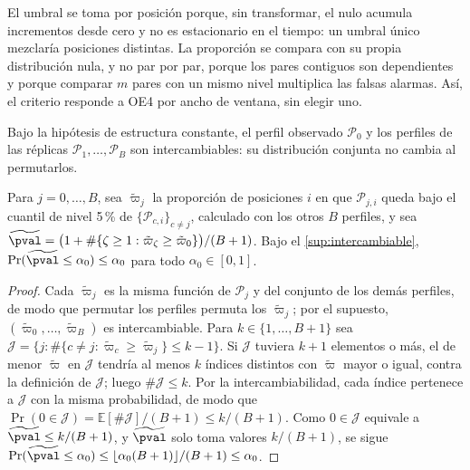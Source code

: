 El umbral se toma por posición porque, sin transformar, el nulo acumula incrementos desde cero y
no es estacionario en el tiempo: un umbral único mezclaría posiciones distintas. La proporción se
compara con su propia distribución nula, y no par por par, porque los pares contiguos son
dependientes y porque comparar $m$ pares con un mismo nivel multiplica las falsas alarmas. Así, el
criterio responde a OE4 por ancho de ventana, sin elegir uno.

\begin{supuesto}\label{sup:intercambiable}
Bajo la hipótesis de estructura constante, el perfil observado $\mathcal{P}_0$ y los perfiles de las réplicas
$\mathcal{P}_1,\dots,\mathcal{P}_B$ son intercambiables: su distribución conjunta no cambia al permutarlos.
\end{supuesto}

\begin{proposicion}\label{prop:oe4}
Para $j=0,\dots,B$, sea $\tilde\varpi_j$ la proporción de posiciones $i$ en que $\mathcal{P}_{j,i}$ queda bajo el
cuantil de nivel 5\,\% de $\{\mathcal{P}_{c,i}\}_{c\ne j}$, calculado con los otros $B$ perfiles, y sea
$\widetilde{\pval}=\bigl(1+\#\{\zeta\ge1:\tilde\varpi_\zeta\ge\tilde\varpi_0\}\bigr)/(B+1)$. Bajo el \cref{sup:intercambiable},
$\Pr(\widetilde{\pval}\le\alpha_0)\le\alpha_0$ para todo $\alpha_0\in[0,1]$.
\end{proposicion}

\begin{proof}
Cada $\tilde\varpi_j$ es la misma función de $\mathcal{P}_j$ y del conjunto de los demás perfiles, de modo que permutar
los perfiles permuta los $\tilde\varpi_j$; por el supuesto, $(\tilde\varpi_0,\dots,\tilde\varpi_B)$ es intercambiable. Para
$k\in\{1,\dots,B+1\}$ sea $\mathcal{J}=\{j:\#\{c\ne j:\tilde\varpi_c\ge\tilde\varpi_j\}\le k-1\}$. Si $\mathcal{J}$ tuviera $k+1$ elementos
o más, el de menor $\tilde\varpi$ en $\mathcal{J}$ tendría al menos $k$ índices distintos con $\tilde\varpi$ mayor o igual, contra
la definición de $\mathcal{J}$; luego $\#\mathcal{J}\le k$. Por la intercambiabilidad, cada índice pertenece a $\mathcal{J}$ con
la misma probabilidad, de modo que $\Pr(0\in\mathcal{J})=\mathbb{E}[\#\mathcal{J}]/(B+1)\le k/(B+1)$. Como $0\in\mathcal{J}$
equivale a $\widetilde{\pval}\le k/(B+1)$, y $\widetilde{\pval}$ solo toma valores $k/(B+1)$, se sigue
$\Pr(\widetilde{\pval}\le\alpha_0)\le\lfloor\alpha_0(B+1)\rfloor/(B+1)\le\alpha_0$.
\end{proof}

